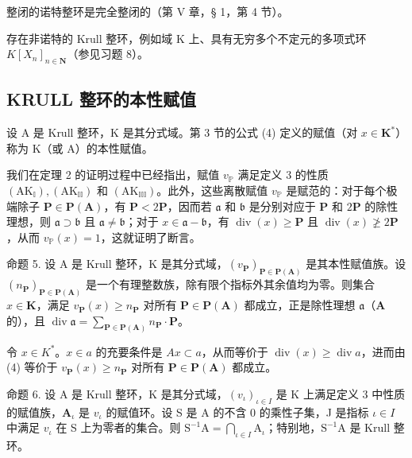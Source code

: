 整闭的诺特整环是完全整闭的（第 V 章，§ 1，第 4 节）。

存在非诺特的 Krull 整环，例如域 K 上、具有无穷多个不定元的多项式环 \(K[X_{n}]_{n\in\mathbf{N}}\)（参见习题 8）。

\subsection{KRULL 整环的本性赋值}

设 A 是 Krull 整环，K 是其分式域。第 3 节的公式 (4) 定义的赋值（对 \(x \in \mathbf{K}^*\)）称为 K（或 A）的本性赋值。

我们在定理 2 的证明过程中已经指出，赋值 \(v_{\mathbb{P}}\) 满足定义 3 的性质 \((\mathrm{AK}_{\mathbb{I}}), (\mathrm{AK}_{\mathbb{II}})\) 和 \((\mathrm{AK}_{\mathbb{III}})\)。此外，这些离散赋值 \(v_{\mathbb{P}}\) 是赋范的：对于每个极端除子 \(\mathbf{P} \in \mathbf{P}(\mathbf{A})\)，有 \(\mathbf{P} < 2\mathbf{P}\)，因而若 \(\mathfrak{a}\) 和 \(\mathfrak{b}\) 是分别对应于 \(\mathbf{P}\) 和 \(2\mathbf{P}\) 的除性理想，则 \(\mathfrak{a} \supset \mathfrak{b}\) 且 \(\mathfrak{a} \neq \mathfrak{b}\)；对于 \(x \in \mathfrak{a} - \mathfrak{b}\)，有 \(\operatorname{div}(x) \geqslant \mathbf{P}\) 且 \(\operatorname{div}(x) \not\geqslant 2\mathbf{P}\)，从而 \(v_{\mathbb{P}}(x) = 1\)，这就证明了断言。

命题 5. 设 A 是 Krull 整环，K 是其分式域，\((v_{\mathbf{P}})_{\mathbf{P} \in \mathbf{P}(\mathbf{A})}\) 是其本性赋值族。设 \((n_{\mathbf{P}})_{\mathbf{P} \in \mathbf{P}(\mathbf{A})}\) 是一个有理整数族，除有限个指标外其余值均为零。则集合 \(x \in \mathbf{K}\)，满足 \(v_{\mathbf{P}}(x) \geqslant n_{\mathbf{P}}\) 对所有 \(\mathbf{P} \in \mathbf{P}(\mathbf{A})\) 都成立，正是除性理想 \(\mathfrak{a}\)（\(\mathbf{A}\) 的），且 \(\operatorname{div} \mathfrak{a} = \sum_{\mathbf{P} \in \mathbf{P}(\mathbf{A})} n_{\mathbf{P}} \cdot \mathbf{P}\)。

令 \(x \in K^*\)。\(x \in a\) 的充要条件是 \(Ax \subset a\)，从而等价于 \(\operatorname{div}(x) \geqslant \operatorname{div} a\)，进而由 (4) 等价于 \(v_{\mathbf{P}}(x) \geqslant n_{\mathbf{P}}\) 对所有 \(\mathbf{P} \in \mathbf{P}(\mathbf{A})\) 都成立。

命题 6. 设 A 是 Krull 整环，K 是其分式域，\((v_{\iota})_{\iota \in I}\) 是 K 上满足定义 3 中性质的赋值族，\(\mathbf{A}_{\iota}\) 是 \(v_{\iota}\) 的赋值环。设 S 是 A 的不含 0 的乘性子集，J 是指标 \(\iota \in I\) 中满足 \(v_{\iota}\) 在 S 上为零者的集合。则 \(\mathrm{S}^{-1}\mathrm{A} = \bigcap_{\iota \in I}\mathrm{A}_{\iota}\)；特别地，\(\mathrm{S}^{-1}\mathrm{A}\) 是 Krull 整环。

